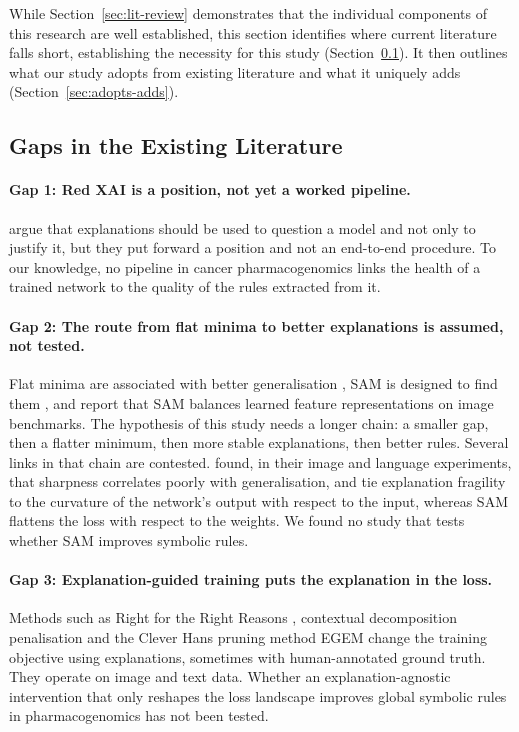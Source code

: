 While Section~\ref{sec:lit-review} demonstrates that the individual components of this research are well established, this section identifies where current literature falls short, establishing the necessity for this study (Section~\ref{sec:gaps}). It then outlines what our study adopts from existing literature and what it uniquely adds (Section~\ref{sec:adopts-adds}).

\subsection{Gaps in the Existing Literature}
\label{sec:gaps}

\paragraph{Gap 1: Red XAI is a position, not yet a worked pipeline.}
\citet{biecek2024} argue that explanations should be used to question a model and not only to justify it, but they put forward a position and not an end-to-end procedure. To our knowledge, no pipeline in cancer pharmacogenomics links the health of a trained network to the quality of the rules extracted from it.

\paragraph{Gap 2: The route from flat minima to better explanations is assumed, not tested.}
Flat minima are associated with better generalisation \citep{keskar2017,li2018}, SAM is designed to find them \citep{foret2021}, and \citet{springer2024} report that SAM balances learned feature representations on image benchmarks. The hypothesis of this study needs a longer chain: a smaller gap, then a flatter minimum, then more stable explanations, then better rules. Several links in that chain are contested. \citet{andriushchenko2023} found, in their image and language experiments, that sharpness correlates poorly with generalisation, and \citet{dombrowski2019} tie explanation fragility to the curvature of the network's output with respect to the input, whereas SAM flattens the loss with respect to the weights. We found no study that tests whether SAM improves symbolic rules.

\paragraph{Gap 3: Explanation-guided training puts the explanation in the loss.}
Methods such as Right for the Right Reasons \citep{ross2017}, contextual decomposition penalisation \citep{rieger2020} and the Clever Hans pruning method EGEM \citep{linhardt2024} change the training objective using explanations, sometimes with human-annotated ground truth. They operate on image and text data. Whether an explanation-agnostic intervention that only reshapes the loss landscape improves global symbolic rules in pharmacogenomics has not been tested.

